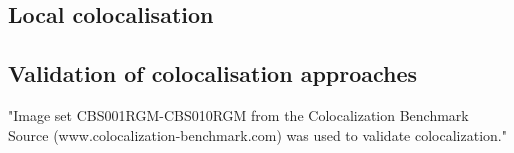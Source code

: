 \subsection{Local colocalisation}
\subsection{Validation of colocalisation approaches}
"Image set CBS001RGM-CBS010RGM from the Colocalization Benchmark Source
(www.colocalization-benchmark.com) was used to validate colocalization."
